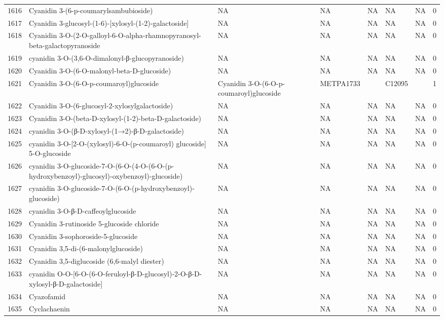 \documentclass[a4paper]{article}
\begin{document}
\begin{longtable}{rlllllll}
  1616 & Cyanidin 3-(6-p-coumarylsambubioside) & NA & NA & NA & NA & NA & 0 \\ 
  1617 & Cyanidin 3-glucosyl-(1-6)-[xylosyl-(1-2)-galactoside] & NA & NA & NA & NA & NA & 0 \\ 
  1618 & Cyanidin 3-O-(2-O-galloyl-6-O-alpha-rhamnopyranosyl-beta-galactopyranoside & NA & NA & NA & NA & NA & 0 \\ 
  1619 & cyanidin 3-O-(3,6-O-dimalonyl-β-glucopyranoside) & NA & NA & NA & NA & NA & 0 \\ 
  1620 & Cyanidin 3-O-(6-O-malonyl-beta-D-glucoside) & NA & NA & NA & NA & NA & 0 \\ 
  1621 & Cyanidin 3-O-(6-O-p-coumaroyl)glucoside & Cyanidin 3-O-(6-O-p-coumaroyl)glucoside & METPA1733 &  & C12095 &  & 1 \\ 
  1622 & Cyanidin 3-O-(6-glucosyl-2-xylosylgalactoside) & NA & NA & NA & NA & NA & 0 \\ 
  1623 & Cyanidin 3-O-(beta-D-xylosyl-(1-2)-beta-D-galactoside) & NA & NA & NA & NA & NA & 0 \\ 
  1624 & cyanidin 3-O-(β-D-xylosyl-(1→2)-β-D-galactoside) & NA & NA & NA & NA & NA & 0 \\ 
  1625 & cyanidin 3-O-[2-O-(xylosyl)-6-O-(p-coumaroyl) glucoside] 5-O-glucoside & NA & NA & NA & NA & NA & 0 \\ 
  1626 & cyanidin 3-O-glucoside-7-O-(6-O-(4-O-(6-O-(p-hydroxybenzoyl)-glucosyl)-oxybenzoyl)-glucoside) & NA & NA & NA & NA & NA & 0 \\ 
  1627 & cyanidin 3-O-glucoside-7-O-(6-O-(p-hydroxybenzoyl)-glucoside) & NA & NA & NA & NA & NA & 0 \\ 
  1628 & cyanidin 3-O-β-D-caffeoylglucoside & NA & NA & NA & NA & NA & 0 \\ 
  1629 & Cyanidin 3-rutinoside 5-glucoside chloride & NA & NA & NA & NA & NA & 0 \\ 
  1630 & Cyanidin 3-sophoroside-5-glucoside & NA & NA & NA & NA & NA & 0 \\ 
  1631 & Cyanidin 3,5-di-(6-malonylglucoside) & NA & NA & NA & NA & NA & 0 \\ 
  1632 & Cyanidin 3,5-diglucoside (6,6-malyl diester) & NA & NA & NA & NA & NA & 0 \\ 
  1633 & cyanidin O-O-[6-O-(6-O-feruloyl-β-D-glucosyl)-2-O-β-D-xylosyl-β-D-galactoside] & NA & NA & NA & NA & NA & 0 \\ 
  1634 & Cyazofamid & NA & NA & NA & NA & NA & 0 \\ 
  1635 & Cyclachaenin & NA & NA & NA & NA & NA & 0 \\ 

\end{longtable}
\end{document}
